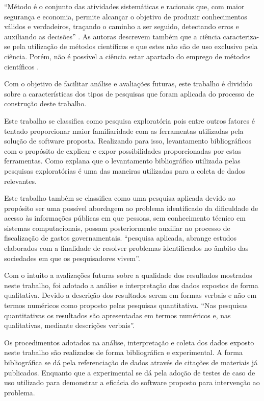“Método é o conjunto das atividades sistemáticas e racionais que, com maior segurança e economia, permite alcançar o objetivo de produzir conhecimentos válidos e verdadeiros, traçando o caminho a ser seguido, detectando erros e auxiliando as decisões” \cite[p. 79]{Lakatos:2010}. As autoras descrevem também que a ciência caracteriza-se pela utilização de métodos científicos e que estes não são de uso exclusivo pela ciência. Porém, não é possível a ciência estar apartado do emprego de métodos científicos \cite{Lakatos:2010}.

Com o objetivo de facilitar análise e avaliações futuras, este trabalho é dividido sobre a características dos tipos de pesquisas que foram aplicada do processo de construção deste trabalho.

Este trabalho se classifica como pesquisa exploratória pois entre outros fatores é tentado proporcionar maior familiaridade com as ferramentas utilizadas pela solução de software proposta. Realizando para isso,  levantamento bibliográficos com o propósito de explicar e expor possibilidades proporcionadas por estas ferramentas. Como \cite{Gil:2010} explana que o levantamento bibliográfico utilizada pelas pesquisas exploratórias é uma das maneiras utilizadas para  a coleta de dados relevantes.

Este trabalho também se classifica como uma pesquisa aplicada devido ao propósito ser uma possível abordagem ao problema identificado da dificuldade de acesso às informações públicas em que pessoas, sem conhecimento técnico em sistemas computacionais, possam posteriormente auxiliar no processo de fiscalização de gastos governamentais. \cite[p. 25]{Gil:2010} “pesquisa aplicada, abrange estudos elaborados com a finalidade de resolver problemas identificados no âmbito das sociedades em que os pesquisadores vivem”.

Com o intuito a avalizações futuras sobre a qualidade dos resultados  mostrados neste trabalho, foi adotado a análise e interpretação dos dados expostos de forma qualitativa. Devido a descrição dos resultados serem em formas verbais e não em termos numéricos como proposto pelas pesquisas quantitativa. \cite[p. 39]{Gil:2010} “Nas pesquisas quantitativas os resultados são apresentadas em termos numéricos e, nas qualitativas, mediante descrições verbais”.

Os procedimentos adotados na análise, interpretação e coleta dos dados exposto neste trabalho são realizados de forma bibliográfica e experimental. A forma bibliográfica se dá pela referenciação de dados através de citações de materiais já publicados. Enquanto que a experimental se dá pela adoção de testes de caso de uso utilizado para demonstrar a eficácia do software proposto para intervenção ao problema.
